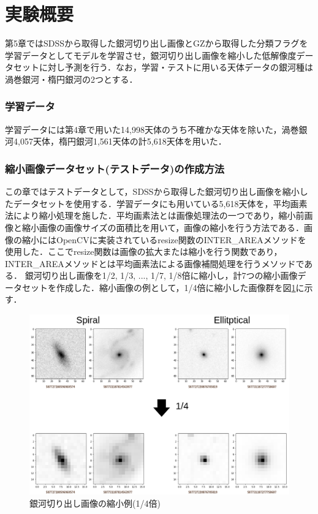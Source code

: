 \documentclass[a4j, 11pt]{jreport}
\begin{document}
\section{実験概要}
第5章ではSDSSから取得した銀河切り出し画像とGZから取得した分類フラグを学習データとしてモデルを学習させ，銀河切り出し画像を縮小した低解像度データセットに対し予測を行う．なお，学習・テストに用いる天体データの銀河種は渦巻銀河・楕円銀河の2つとする．

\subsubsection{学習データ}
学習データには第4章で用いた14,998天体のうち不確かな天体を除いた，渦巻銀河4,057天体，楕円銀河1,561天体の計5,618天体を用いた．

\subsubsection{縮小画像データセット(テストデータ)の作成方法}
この章ではテストデータとして，SDSSから取得した銀河切り出し画像を縮小したデータセットを使用する．学習データにも用いている5,618天体を，平均画素法により縮小処理を施した．平均画素法とは画像処理法の一つであり，縮小前画像と縮小画像の画像サイズの面積比を用いて，画像の縮小を行う方法である．画像の縮小にはOpenCVに実装されているresize関数のINTER\_AREAメソッドを使用した．ここでresize関数は画像の拡大または縮小を行う関数であり，INTER\_AREAメソッドとは平均画素法による画像補間処理を行うメソッドである．
銀河切り出し画像を1/2, 1/3, ..., 1/7, 1/8倍に縮小し，計7つの縮小画像データセットを作成した．縮小画像の例として，1/4倍に縮小した画像群を図\ref{fig:shrink_1_4}に示す．

\begin{figure}[H]
 \centering
 \includegraphics[width=13cm]{images/5syou/syuron_5syou_kakudai/ver1/5syou_shrink_ver1.png}
 \caption{銀河切り出し画像の縮小例(1/4倍)}
 \label{fig:shrink_1_4}
\end{figure}
\end{document}
